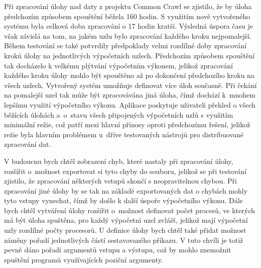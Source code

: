 Při zpracování úlohy nad daty z projektu Common Crawl se zjistilo, že by úloha předchozím způsobem spouštění běžela 160 hodin. S využitím nově vytvořeného systému byla celková doba zpracování o 17 hodin kratší. Výsledná úspora času je však závislá na tom, na jakém uzlu bylo zpracování každého kroku nejpomalejší. Během testování se také potvrdily předpoklady velmi rozdílné doby zpracování kroků úlohy na jednotlivých výpočetních uzlech. Předchozím způsobem spouštění tak docházelo k velkému plýtvání výpočetním výkonem, jelikož zpracování každého kroku úlohy mohlo být spouštěno až po dokončení předchozího kroku na všech uzlech. Vytvořený systém umožňuje definovat více úloh současně. Při čekání na pomalejší uzel tak může být zpracovávána jiná úloha, čímž dochází k~mnohem lepšímu využití výpočetního výkonu. Aplikace poskytuje uživateli přehled o všech běžících úlohách a~o~stavu všech připojených výpočetních uzlů s využitím minimální režie, což patří mezi hlavní přínosy oproti předchozímu řešení, jelikož režie byla hlavním problémem u~dříve testovaných nástrojů pro distribuované zpracování dat.
\enlargethispage{2\baselineskip}

V budoucnu bych chtěl zobrazení chyb, které nastaly při zpracování úlohy, rozšířit o~možnost exportovat si tyto chyby do souboru, jelikož se při testování zjistilo, že zpracování některých vstupů skončí s neopravitelnou chybou. Při zpracování jiné úlohy by se tak na základě exportovaných dat o chybách mohly tyto vstupy vynechat, čímž by došlo k další úspoře výpočetního výkonu. Dále bych chtěl vytváření úlohy rozšířit o~možnost definovat počet procesů, ve kterých má být úloha spuštěna, pro každý výpočetní uzel zvlášť, jelikož mají výpočetní uzly rozdílné počty procesorů. U definice úlohy bych chtěl také přidat možnost záměny pořadí jednotlivých částí sestavovaného příkazu. V tuto chvíli je totiž pevně dáno pořadí argumentů vstupu a výstupu, což by mohlo znemožnit spuštění programů využívajících poziční argumenty.
\enlargethispage{\baselineskip}